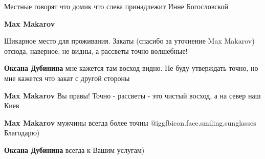  
 
 
 
 

Местные говорят что домик что слева принадлежит Инне Богословской

\textbf{Max Makarov} 

Шикарное место для проживания. Закаты (спасибо за уточнение Max Makarov) отсюда,
наверное, не видны, а рассветы точно волшебные!

\textbf{Оксана Дубинина} мне кажется там восход видно. Не буду утверждать точно, но мне кажется что закат с другой стороны

\textbf{Max Makarov} Вы правы!
Точно - рассветы - это чистый восход, а на север наш Киев

\textbf{Max Makarov} мужчины всегда более точны @igg{fbicon.face.smiling.sunglasses} 
Благодарю)

\textbf{Оксана Дубинина} всегда к Вашим услугам)
